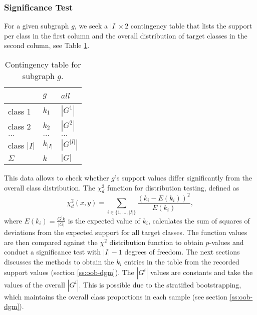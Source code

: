 \documentclass{article}
\begin{document}
\subsubsection{Significance Test}
\label{ss:significance-test}
For a given subgraph $g$, we seek a $|I| \times 2$ contingency table that lists the
support per class in the first column and the overall distribution of target
classes in the second column, see Table \ref{t-ContingencyTableIndTest}.
\begin{table}[t]
  \centering
  \begin{tabular}{|l|l|l|}
    \hline
    ~           &	$g$       & $all$       \\\hline
    class 1	    &	$k_1$     & $|G^1|$     \\\hline
    class 2 	  &	$k_2$     & $|G^2|$     \\\hline
    $\ldots$ 	  &	$\ldots$  & $\ldots$    \\\hline
    class $|I|$	&	$k_{|I|}$ & $|G^{|I|}|$ \\\hline
    $\Sigma$	  &	$k$       & $|G|$       \\\hline
  \end{tabular}
  \caption[]{Contingency table for subgraph $g$.}
  \label{t-ContingencyTableIndTest}
\end{table}
This data allows to check whether $g$'s support values differ
significantly from the overall class distribution.  The $\chi^2_d$ function for
distribution testing, defined as
\begin{equation}
  \chi^2_d(x,y) = \sum_{i \in \{1,\ldots,|I|\}} \frac{(k_i-E(k_i))^2}{E(k_i)},
  \label{eq:chid}
\end{equation} 
where $E(k_i)=\frac{G^{i}k}{|G|}$ is the expected value of $k_i$, calculates
the sum of squares of deviations from the expected support for all target
classes. The function values are then compared against the $\chi^2$
distribution function to obtain $p$-values and conduct a significance test with
$|I|-1$ degrees of freedom.  The next sections discusses the methods to obtain the $k_i$
entries in the table from the recorded support values (section
\ref{ss:oob-dgm}).  The $|G^{i}|$ values are constants and take the values of
the overall $|G^{i}|$.  This is possible due to the stratified bootstrapping,
which maintains the overall class proportions in each sample (see section
\ref{ss:oob-dgm}).
\end{document}

